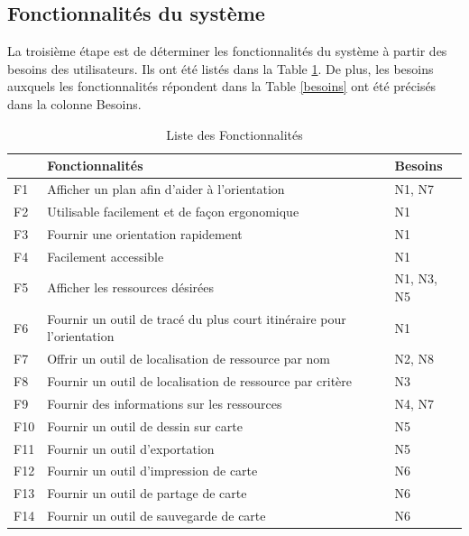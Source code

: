 \documentclass[
    iai, %
    il, %
]{heig-tb}
\begin{document}
\subsection{Fonctionnalités du système}
La troisième étape est de déterminer les fonctionnalités du système à partir des besoins des utilisateurs.
Ils ont été listés dans la Table \ref{fonctions}.
De plus, les besoins auxquels les fonctionnalités répondent dans la Table \ref{besoins} ont été précisés dans la colonne Besoins.
\begin{table}[h]
    \begin{center}
        \begin{tabular}{l|l|l}
                & Fonctionnalités                                                       & Besoins    \\ \hline
            F1  & Afficher un plan afin d'aider à l'orientation                         & N1, N7     \\
            F2  & Utilisable facilement et de façon ergonomique                         & N1         \\
            F3  & Fournir une orientation rapidement                                    & N1         \\
            F4  & Facilement accessible                                                 & N1         \\
            F5  & Afficher les ressources désirées                                      & N1, N3, N5 \\
            F6  & Fournir un outil de tracé du plus court itinéraire pour l'orientation & N1         \\
            F7  & Offrir un outil de localisation de ressource par nom                  & N2, N8     \\
            F8  & Fournir un outil de localisation de ressource par critère             & N3         \\
            F9  & Fournir des informations sur les ressources                           & N4, N7     \\
            F10 & Fournir un outil de dessin sur carte                                  & N5         \\
            F11 & Fournir un outil d'exportation                                        & N5         \\
            F12 & Fournir un outil d'impression de carte                                & N6         \\
            F13 & Fournir un outil de partage de carte                                  & N6         \\
            F14 & Fournir un outil de sauvegarde de carte                               & N6
        \end{tabular}
        \caption{Liste des Fonctionnalités \label{fonctions}}
    \end{center}
\end{table}
\end{document}

